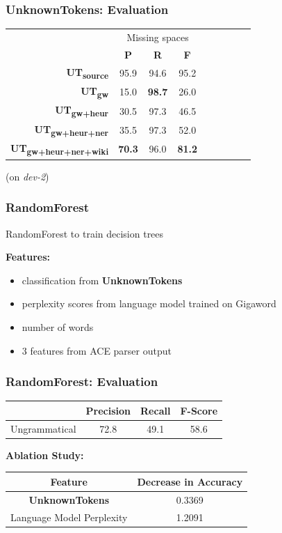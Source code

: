 \documentclass[table]{beamer}
\begin{document}
\begin{frame}
  \frametitle{\textbf{UnknownTokens}: Evaluation}
  \begin{tabular}{r|c|c|c|c|c|c|c|c|}
  & \multicolumn{3}{c|}{Missing spaces}\\
  & \textbf{P} & \textbf{R} & \textbf{F}\\
  \hline
  \textbf{UT\textsubscript{source}} & 95.9 & 94.6 & 95.2\\
  \hline\hline\pause
  \textbf{UT\textsubscript{gw}} & 15.0 & \textbf{98.7} & 26.0\\
  \hline\pause
  \textbf{UT\textsubscript{gw+heur}} & 30.5 & 97.3 & 46.5\\
  \hline\pause
  \textbf{UT\textsubscript{gw+heur+ner}} & 35.5 & 97.3 & 52.0\\
  \hline\pause
  \textbf{UT\textsubscript{gw+heur+ner+wiki}} & \textbf{70.3} & 96.0 & \textbf{81.2}\\
  \hline
  \end{tabular}

  \vspace{0.5cm}
  (on \textit{dev-2})
\end{frame}

\begin{frame}
  \frametitle{\textbf{RandomForest}}
  RandomForest \citep{breiman2001random} to train decision trees
  \vspace{0.6cm}

  \textbf{Features:}
  \begin{itemize}
    \item classification from \textbf{UnknownTokens}\pause
    \item perplexity scores from language model trained on Gigaword\pause
    \item number of words
    \item 3 features from ACE parser output %
  \end{itemize}
\end{frame}

\begin{frame}
  \frametitle{\textbf{RandomForest}: Evaluation}
  \quad\quad\begin{tabular}{r|c|c|c|}
  & \textbf{Precision} & \textbf{Recall} & \textbf{F-Score}\\
  \hline
  Ungrammatical & 72.8 & 49.1 & 58.6\\
  \hline
  \end{tabular}

  \textbf{Ablation Study:}
  \begin{tabular}{c|c}
  \hline\hline
  Feature & Decrease in Accuracy\\%
  \hline
  \textbf{UnknownTokens} & 0.3369\\
  Language Model Perplexity & 1.2091\\
  
  \hline\hline
  \end{tabular}

\end{frame}
\end{document}
